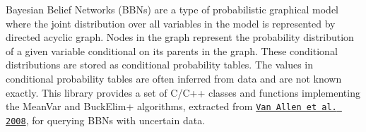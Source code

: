 Bayesian Belief Networks (B\+B\+Ns) are a type of probabilistic graphical model where the joint distribution over all variables in the model is represented by directed acyclic graph. Nodes in the graph represent the probability distribution of a given variable conditional on it\textquotesingle{}s parents in the graph. These conditional distributions are stored as conditional probability tables. The values in conditional probability tables are often inferred from data and are not known exactly. This library provides a set of C/\+C++ classes and functions implementing the Mean\+Var and Buck\+Elim+ algorithms, extracted from \href{https://doi.org/10.1016/j.artint.2007.09.004}{\tt Van Allen et al. 2008}, for querying B\+B\+Ns with uncertain data. 